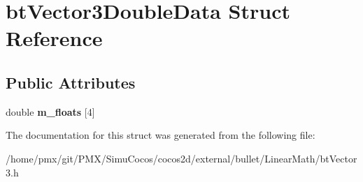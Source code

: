\hypertarget{structbtVector3DoubleData}{}\section{bt\+Vector3\+Double\+Data Struct Reference}
\label{structbtVector3DoubleData}
\subsection*{Public Attributes}
\begin{DoxyCompactItemize}
\item 
\mbox{\label{structbtVector3DoubleData_a222a99ded95f62a9d39828b42fb4d56c}} 
double {\bfseries m\+\_\+floats} \mbox{[}4\mbox{]}
\end{DoxyCompactItemize}


The documentation for this struct was generated from the following file\+:\begin{DoxyCompactItemize}
\item 
/home/pmx/git/\+P\+M\+X/\+Simu\+Cocos/cocos2d/external/bullet/\+Linear\+Math/bt\+Vector3.\+h\end{DoxyCompactItemize}
